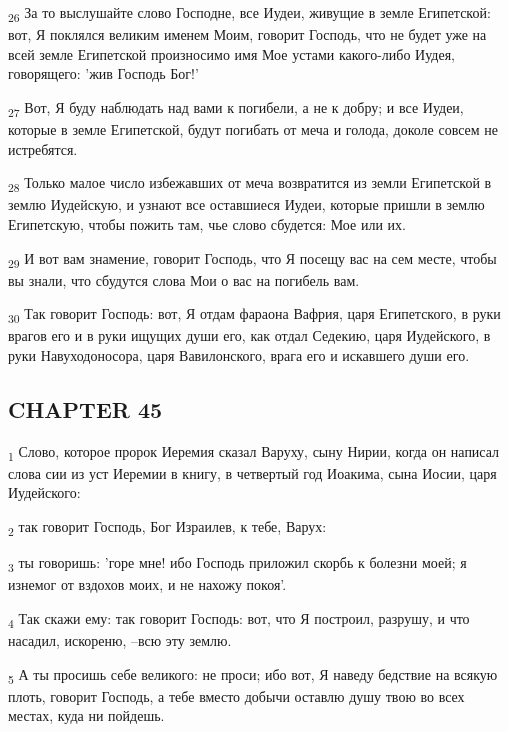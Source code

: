 \begin{tcolorbox}
\textsubscript{26} За то выслушайте слово Господне, все Иудеи, живущие в земле Египетской: вот, Я поклялся великим именем Моим, говорит Господь, что не будет уже на всей земле Египетской произносимо имя Мое устами какого-либо Иудея, говорящего: 'жив Господь Бог!'
\end{tcolorbox}
\begin{tcolorbox}
\textsubscript{27} Вот, Я буду наблюдать над вами к погибели, а не к добру; и все Иудеи, которые в земле Египетской, будут погибать от меча и голода, доколе совсем не истребятся.
\end{tcolorbox}
\begin{tcolorbox}
\textsubscript{28} Только малое число избежавших от меча возвратится из земли Египетской в землю Иудейскую, и узнают все оставшиеся Иудеи, которые пришли в землю Египетскую, чтобы пожить там, чье слово сбудется: Мое или их.
\end{tcolorbox}
\begin{tcolorbox}
\textsubscript{29} И вот вам знамение, говорит Господь, что Я посещу вас на сем месте, чтобы вы знали, что сбудутся слова Мои о вас на погибель вам.
\end{tcolorbox}
\begin{tcolorbox}
\textsubscript{30} Так говорит Господь: вот, Я отдам фараона Вафрия, царя Египетского, в руки врагов его и в руки ищущих души его, как отдал Седекию, царя Иудейского, в руки Навуходоносора, царя Вавилонского, врага его и искавшего души его.
\end{tcolorbox}
\subsection{CHAPTER 45}
\begin{tcolorbox}
\textsubscript{1} Слово, которое пророк Иеремия сказал Варуху, сыну Нирии, когда он написал слова сии из уст Иеремии в книгу, в четвертый год Иоакима, сына Иосии, царя Иудейского:
\end{tcolorbox}
\begin{tcolorbox}
\textsubscript{2} так говорит Господь, Бог Израилев, к тебе, Варух:
\end{tcolorbox}
\begin{tcolorbox}
\textsubscript{3} ты говоришь: 'горе мне! ибо Господь приложил скорбь к болезни моей; я изнемог от вздохов моих, и не нахожу покоя'.
\end{tcolorbox}
\begin{tcolorbox}
\textsubscript{4} Так скажи ему: так говорит Господь: вот, что Я построил, разрушу, и что насадил, искореню, --всю эту землю.
\end{tcolorbox}
\begin{tcolorbox}
\textsubscript{5} А ты просишь себе великого: не проси; ибо вот, Я наведу бедствие на всякую плоть, говорит Господь, а тебе вместо добычи оставлю душу твою во всех местах, куда ни пойдешь.
\end{tcolorbox}
